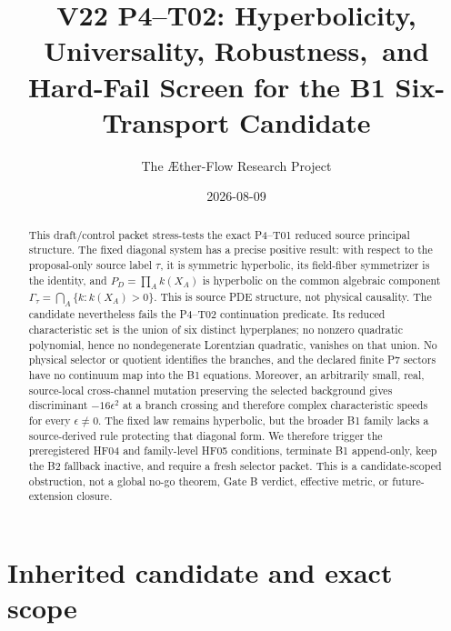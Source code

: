 \documentclass[11pt]{article}
\title{V22 P4--T02: Hyperbolicity, Universality, Robustness,\
and Hard-Fail Screen for the B1 Six-Transport Candidate}
\author{The \AE ther-Flow Research Project}
\date{2026-08-09}
\newcommand{\Gam}{\Gamma_{\tau}}
\begin{document}
\maketitle

\begin{abstract}
This draft/control packet stress-tests the exact P4--T01 reduced source
principal structure.  The fixed diagonal system has a precise positive result:
with respect to the proposal-only source label $\tau$, it is symmetric
hyperbolic, its field-fiber symmetrizer is the identity, and
$P_D=\prod_A k(X_A)$ is hyperbolic on the common algebraic component
$\Gam=\bigcap_A\{k:k(X_A)>0\}$.  This is source PDE structure, not physical
causality.  The candidate nevertheless fails the P4--T02 continuation
predicate.  Its reduced characteristic set is the union of six distinct
hyperplanes; no nonzero quadratic polynomial, hence no nondegenerate
Lorentzian quadratic, vanishes on that union.  No physical selector or quotient
identifies the branches, and the declared finite P7 sectors have no continuum
map into the B1 equations.  Moreover, an arbitrarily small, real, source-local
cross-channel mutation preserving the selected background gives
discriminant $-16\epsilon^2$ at a branch crossing and therefore complex
characteristic speeds for every $\epsilon\ne0$.  The fixed law remains
hyperbolic, but the broader B1 family lacks a source-derived rule protecting
that diagonal form.  We therefore trigger the preregistered HF04 and
family-level HF05 conditions, terminate B1 append-only, keep the B2 fallback
inactive, and require a fresh selector packet.  This is a candidate-scoped
obstruction, not a global no-go theorem, Gate B verdict, effective metric, or
future-extension closure.
\end{abstract}

\section{Inherited candidate and exact scope}
\end{document}

